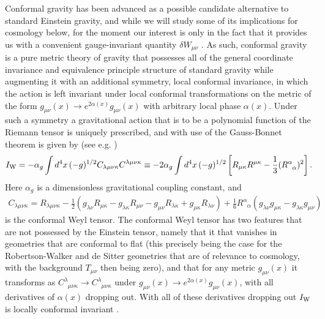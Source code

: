 \documentclass[aps,onecolumn,10pt]{revtex4}
\numberwithin{equation}{section}
\numberwithin{equation}{section}
\begin{document}
Conformal gravity has been advanced \cite{Mannheim1989,Mannheim1994,Mannheim2006,Mannheim2012b,Mannheim2017} as a possible candidate alternative to standard Einstein gravity, and while we will study some of its implications for cosmology below, for the moment our interest is only in the fact that it provides us with a convenient gauge-invariant quantity $\delta W_{\mu\nu}$ \cite{footnote4}. As such, conformal gravity is a pure metric theory of gravity that possesses all of the general coordinate invariance and equivalence principle structure of standard gravity while augmenting it with an additional symmetry, local conformal invariance, in which  the action is left invariant under local conformal transformations on the metric of the form $g_{\mu\nu}(x)\rightarrow e^{2\alpha(x)}g_{\mu\nu}(x)$ with arbitrary local phase $\alpha(x)$. Under such a symmetry a gravitational action that is to be a polynomial function of the Riemann tensor is uniquely prescribed, and with use of the Gauss-Bonnet theorem is given by (see e.g. \cite{Mannheim2006}) 
%
\begin{eqnarray}
I_{\rm W}=-\alpha_g\int d^4x\, (-g)^{1/2}C_{\lambda\mu\nu\kappa}
C^{\lambda\mu\nu\kappa}
\equiv -2\alpha_g\int d^4x\, (-g)^{1/2}\left[R_{\mu\kappa}R^{\mu\kappa}-\frac{1}{3} (R^{\alpha}_{\phantom{\alpha}\alpha})^2\right].
\label{4.1}
\end{eqnarray}
% 
Here $\alpha_g$ is a dimensionless  gravitational coupling constant, and
%
\begin{eqnarray}
C_{\lambda\mu\nu\kappa}= R_{\lambda\mu\nu\kappa}
-\frac{1}{2}\left(g_{\lambda\nu}R_{\mu\kappa}-
g_{\lambda\kappa}R_{\mu\nu}-
g_{\mu\nu}R_{\lambda\kappa}+
g_{\mu\kappa}R_{\lambda\nu}\right)
+\frac{1}{6}R^{\alpha}_{\phantom{\alpha}\alpha}\left(
g_{\lambda\nu}g_{\mu\kappa}-
g_{\lambda\kappa}g_{\mu\nu}\right)
\label{4.2}
\end{eqnarray}
% 
is the conformal Weyl tensor. The conformal Weyl tensor has two features that are not possessed by the Einstein tensor, namely that it that vanishes in geometries that are conformal to flat (this precisely being the case for  the Robertson-Walker and de Sitter geometries that are of relevance to cosmology, with the background $T_{\mu\nu}$ then being zero),  and that for any metric $g_{\mu\nu}(x)$ it transforms as  $C^{\lambda}_{\phantom{\lambda}\mu\nu\kappa} \rightarrow  C^{\lambda}_{\phantom{\lambda}\mu\nu\kappa}$ under $g_{\mu\nu}(x)\rightarrow e^{2\alpha(x)}g_{\mu\nu}(x)$, with all derivatives of $\alpha(x)$ dropping out. With all of these derivatives dropping out $I_{\rm W}$ is locally conformal invariant \cite{footnote5}.
\end{document}
